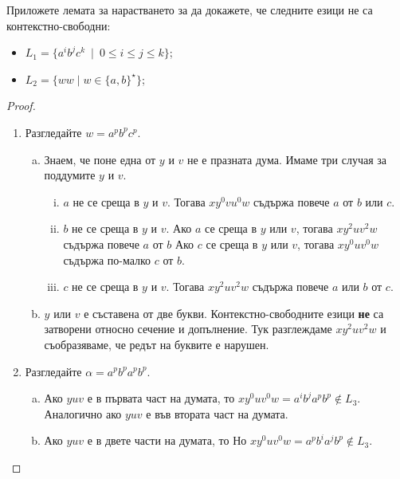\begin{example}
  Приложете лемата за нарастването за да докажете, че 
  следните езици не са контекстно-свободни:
  \begin{itemize}
  \item
    $L_1 = \{a^ib^jc^k\ \mid\ 0 \leq i \leq j \leq k\}$;
  \item
    $L_2 = \{ww\mid w\in \{a,b\}^\star\}$;
  \end{itemize}
\end{example}
\begin{proof}
  \begin{enumerate}[1)]
  \item
    Разгледайте $w = a^pb^pc^p$.
    \begin{enumerate}[a)]
    \item
      Знаем, че поне една от $y$ и $v$ не е празната дума.
      Имаме три случая за поддумите $y$ и $v$.
      \begin{enumerate}[i)]
      \item
        $a$ не се среща в $y$ и $v$.
        Тогава $xy^0vu^0w$ съдържа повече $a$ от $b$ или $c$.
      \item
        $b$ не се среща в $y$ и $v$.
        Ако $a$ се среща в $y$ или $v$, тогава $xy^2uv^2w$ съдържа повече $a$ от $b$
        Ако $c$ се среща в $y$ или $v$, тогава $xy^0uv^0w$ съдържа по-малко $c$ от $b$.
      \item
        $c$ не се среща в $y$ и $v$.
        Тогава $xy^2uv^2w$ съдържа повече $a$ или $b$ от $c$.
      \end{enumerate}      
    \item
      $y$ или $v$ е съставена от две букви.  Контекстно-свободните езици {\bf не} са затворени относно сечение и допълнение.
      Тук разглеждаме $xy^2uv^2w$ и съобразяваме, че редът на буквите е нарушен.
    \end{enumerate}
  \item
    Разгледайте $\alpha = a^pb^pa^pb^p$.
    \begin{enumerate}[a)]
    \item
      Ако $yuv$ е в първата част на думата, то 
      $xy^0uv^0w = a^ib^ja^pb^p \not\in L_3$.
      Аналогично ако $yuv$ е във втората част на думата.
    \item
      Ако $yuv$ е в двете части на думата, то 
      Но $xy^0uv^0w = a^pb^ia^jb^p \not\in L_3$.
    \end{enumerate}    
  \end{enumerate}
\end{proof}


